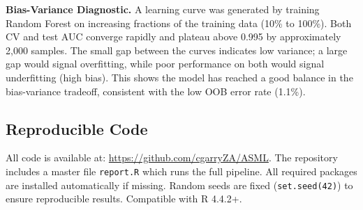 \noindent\textbf{Bias-Variance Diagnostic.}
A learning curve was generated by training Random Forest on increasing fractions of the training data (10\% to 100\%). Both CV and test AUC converge rapidly and plateau above 0.995 by approximately 2,000 samples. The small gap between the curves indicates low variance; a large gap would signal overfitting, while poor performance on both would signal underfitting (high bias). This shows the model has reached a good balance in the bias-variance tradeoff, consistent with the low OOB error rate (1.1\%).

\subsection*{Reproducible Code}
All code is available at: \url{https://github.com/cgarryZA/ASML}. The repository includes a master file \texttt{report.R} which runs the full pipeline. All required packages are installed automatically if missing. Random seeds are fixed (\texttt{set.seed(42)}) to ensure reproducible results. Compatible with R 4.4.2+.
